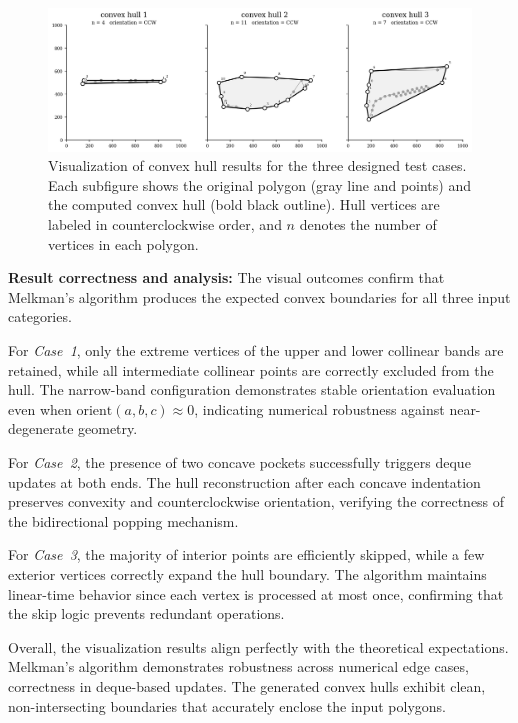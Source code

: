 \documentclass{article}
\begin{document}
\begin{figure}[H]
    \centering
    \includegraphics[width=0.95\linewidth]{Pictures/hulls.png}
    \caption{Visualization of convex hull results for the three designed test cases. 
    Each subfigure shows the original polygon (gray line and points) and the computed convex hull (bold black outline). 
    Hull vertices are labeled in counterclockwise order, and $n$ denotes the number of vertices in each polygon.}
    \label{fig:hulls}
\end{figure}

\textbf{Result correctness and analysis:}  
The visual outcomes confirm that Melkman’s algorithm produces the expected convex boundaries for all three input categories.

For \emph{Case~1}, only the extreme vertices of the upper and lower collinear bands are retained, while all intermediate collinear points are correctly excluded from the hull. 
The narrow-band configuration demonstrates stable orientation evaluation even when $\text{orient}(a,b,c) \approx 0$, indicating numerical robustness against near-degenerate geometry.

For \emph{Case~2}, the presence of two concave pockets successfully triggers deque updates at both ends. 
The hull reconstruction after each concave indentation preserves convexity and counterclockwise orientation, verifying the correctness of the bidirectional popping mechanism.

For \emph{Case~3}, the majority of interior points are efficiently skipped, while a few exterior vertices correctly expand the hull boundary. 
The algorithm maintains linear-time behavior since each vertex is processed at most once, confirming that the skip logic prevents redundant operations.

Overall, the visualization results align perfectly with the theoretical expectations. 
Melkman’s algorithm demonstrates robustness across numerical edge cases, correctness in deque-based updates. 
The generated convex hulls exhibit clean, non-intersecting boundaries that accurately enclose the input polygons.
\end{document}
